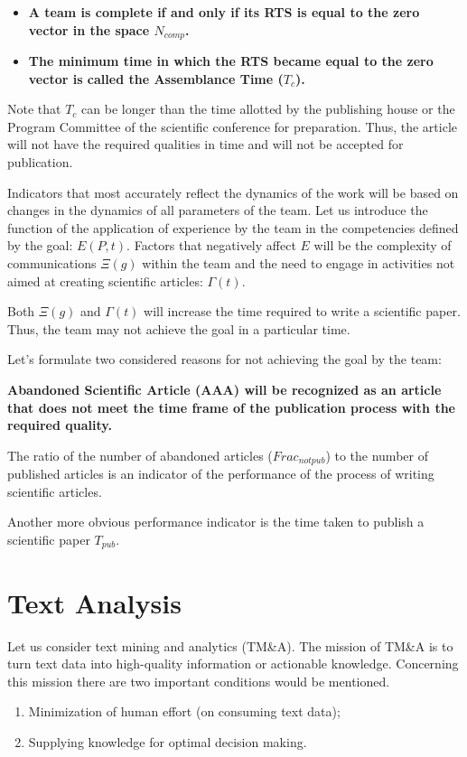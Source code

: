 \documentclass[12pt]{report}
\theoremstyle{definition}
\begin{document}
\begin{itemize}
	\item \textbf{A team is complete if and only if its RTS is equal to the zero vector in the space $N_{comp}$.}
	\item \textbf{The minimum time in which the RTS became equal to the zero vector is called the Assemblance Time ($T_c$).}
\end{itemize}

Note that $T_c$ can be longer than the time allotted by the publishing house or the Program Committee of the scientific conference for preparation. 
Thus, the article will not have the required qualities in time and will not be accepted for publication.

Indicators that most accurately reflect the dynamics of the work will be based on changes in the dynamics of all parameters of the team. 
Let us introduce the function of the application of experience by the team in the competencies defined by the goal: $E (P,t)$.
Factors that negatively affect $E$ will be the complexity of communications $\Xi(g)$ within the team and the need to engage in activities not aimed at creating scientific articles:  $\Gamma(t)$.

Both $\Xi(g)$ and $\Gamma (t)$ will increase the time required to write a scientific paper.
Thus, the team may not achieve the goal in a particular time.

Let's formulate two considered reasons for not achieving the goal by the team:

\textbf{Abandoned Scientific Article (AAA) will be recognized as an article that does not meet the time frame of the publication process with the required quality.} 

The ratio of the number of abandoned articles ($Frac_{notpub}$) to the number of published articles is an indicator of the performance of the process of writing scientific articles.

Another more obvious performance indicator is the time taken to publish a scientific paper $T_{pub}$.

\section{Text Analysis }

Let us consider text mining and analytics (TM\&A). 
The mission of TM\&A is to turn text data into high-quality information or actionable knowledge.
Concerning this mission there are two important conditions would be mentioned.
\begin{enumerate}
	\item Minimization of human effort (on consuming text data);
	\item Supplying knowledge for optimal decision making.
\end{enumerate}
\end{document}
